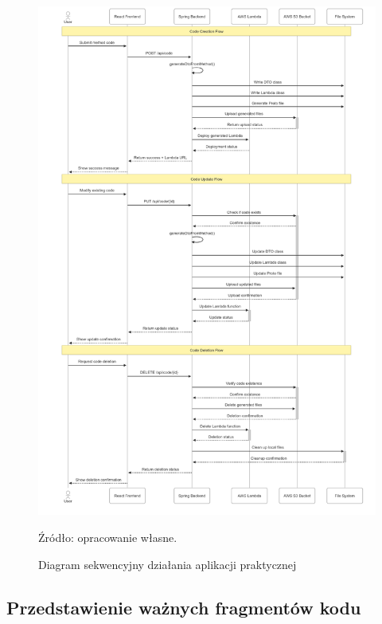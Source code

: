 \documentclass[runningheads,12pt]{llncs}
\begin{document}
\begin{figure}[H] %
    \centering
    \includegraphics[width=\linewidth]{images/sequentinal-diagram.png}
    \caption{Diagram sekwencyjny działania aplikacji praktycznej}
    \label{fig2}
    \vspace{0.5em}
    {\small Źródło: opracowanie własne.}
\end{figure}

\newpage


\subsection{Przedstawienie ważnych fragmentów kodu}
\end{document}
